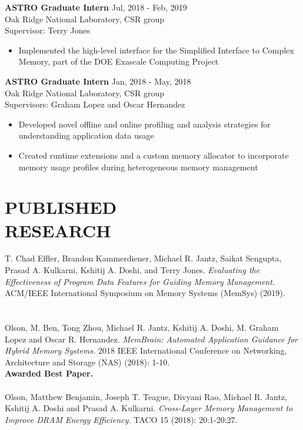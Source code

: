 \documentclass[margin,11pt]{res} %
\begin{document}
\begin{resume}
  {\textbf{ASTRO Graduate Intern}} \hfill Jul, 2018 - Feb, 2019 \\
   Oak Ridge National Laboratory, CSR group \\
   Supervisor: Terry Jones
    \begin{itemize} \itemsep -2pt
      \item Implemented the high-level interface for the Simplified Interface
        to Complex Memory, part of the DOE Exascale Computing Project
    \end{itemize}

  {\textbf{ASTRO Graduate Intern}} \hfill Jan, 2018 - May, 2018 \\
   Oak Ridge National Laboratory, CSR group \\
   Supervisors: Graham Lopez and Oscar Hernandez
    \begin{itemize} \itemsep -2pt
      \item Developed novel offline and online profiling and analysis
        strategies for understanding application data usage
      \item Created runtime extensions and a custom memory allocator to
        incorporate memory usage profiles during heterogeneous memory
        management
    \end{itemize}


\section{PUBLISHED\\RESEARCH}
  {T. Chad Effler, Brandon Kammerdiener, Michael R. Jantz, Saikat Sengupta, Prasad A. Kulkarni, Kshitij A. Doshi, and Terry Jones. \textit{Evaluating the Effectiveness of Program Data Features for Guiding Memory Management.} ACM/IEEE International Symposium on Memory Systems (MemSys) (2019).} \\
  \\\\
  {Olson, M. Ben, Tong Zhou, Michael R. Jantz, Kshitij A. Doshi, M. Graham Lopez and Oscar R. Hernandez. \textit{MemBrain: Automated Application Guidance for Hybrid Memory Systems.} 2018 IEEE International Conference on Networking, Architecture and Storage (NAS) (2018): 1-10. \\
  \textbf{Awarded Best Paper.}}
  \\\\
  {Olson, Matthew Benjamin, Joseph T. Teague, Divyani Rao, Michael R. Jantz, Kshitij A. Doshi and Prasad A. Kulkarni. \textit{Cross-Layer Memory Management to Improve DRAM Energy Efficiency.} TACO 15 (2018): 20:1-20:27.}



\end{resume}
\end{document}
